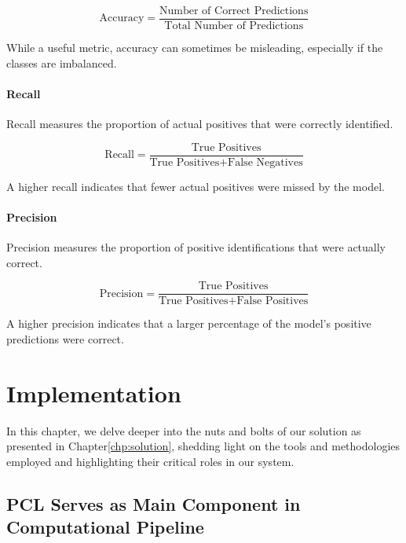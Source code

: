 \documentclass[11pt, a4paper,oneside,chapterprefix=false]{scrbook}
\begin{document}
\begin{equation}
	\text{Accuracy} = \frac{\text{Number of Correct Predictions}}{\text{Total Number of Predictions}}
\end{equation}

While a useful metric, accuracy can sometimes be misleading, especially if the classes are imbalanced.

\subsubsection{Recall}

Recall measures the proportion of actual positives that were correctly identified.

\begin{equation}
	\text{Recall} = \frac{\text{True Positives}}{\text{True Positives} + \text{False Negatives}}
\end{equation}

A higher recall indicates that fewer actual positives were missed by the model.

\subsubsection{Precision}

Precision measures the proportion of positive identifications that were actually correct.

\begin{equation}
	\text{Precision} = \frac{\text{True Positives}}{\text{True Positives} + \text{False Positives}}
\end{equation}

A higher precision indicates that a larger percentage of the model's positive predictions were correct.

\chapter{Implementation}\label{chp:implementation}

In this chapter, we delve deeper into the nuts and bolts of our solution as presented in Chapter\ref{chp:solution}, shedding light on the tools and methodologies employed and highlighting their critical roles in our system.

\section{PCL Serves as Main Component in Computational Pipeline}\label{sec:pcl and eigen}
\end{document}
